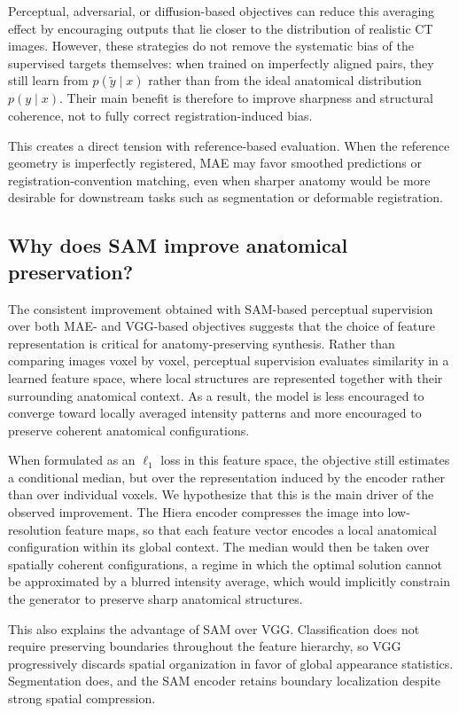 \documentclass[lettersize,journal]{IEEEtran}
\begin{document}
Perceptual, adversarial, or diffusion-based objectives can reduce this averaging effect by encouraging outputs that lie closer to the distribution of realistic CT images. However, these strategies do not remove the systematic bias of the supervised targets themselves: when trained on imperfectly aligned pairs, they still learn from $p(\tilde{y}\mid x)$ rather than from the ideal anatomical distribution $p(y\mid x)$. Their main benefit is therefore to improve sharpness and structural coherence, not to fully correct registration-induced bias.

This creates a direct tension with reference-based evaluation. When the reference geometry is imperfectly registered, MAE may favor smoothed predictions or registration-convention matching, even when sharper anatomy would be more desirable for downstream tasks such as segmentation or deformable registration.

\subsection{Why does SAM improve anatomical preservation?}

The consistent improvement obtained with SAM-based perceptual supervision over both MAE- and VGG-based objectives suggests that the choice of feature representation is critical for anatomy-preserving synthesis. Rather than comparing images voxel by voxel, perceptual supervision evaluates similarity in a learned feature space, where local structures are represented together with their surrounding anatomical context. As a result, the model is less encouraged to converge toward locally averaged intensity patterns and more encouraged to preserve coherent anatomical configurations.

When formulated as an $\ell_1$ loss in this feature space, the objective still estimates a conditional median, but over the representation induced by the encoder rather than over individual voxels. We hypothesize that this is the main driver of the observed improvement. The Hiera encoder compresses the image into low-resolution feature maps, so that each feature vector encodes a local anatomical configuration within its global context. The median would then be taken over spatially coherent configurations, a regime in which the optimal solution cannot be approximated by a blurred intensity average, which would implicitly constrain the generator to preserve sharp anatomical structures.

This also explains the advantage of SAM over VGG. Classification does not require preserving boundaries throughout the feature hierarchy, so VGG progressively discards spatial organization in favor of global appearance statistics. Segmentation does, and the SAM encoder retains boundary localization despite strong spatial compression.
\end{document}
